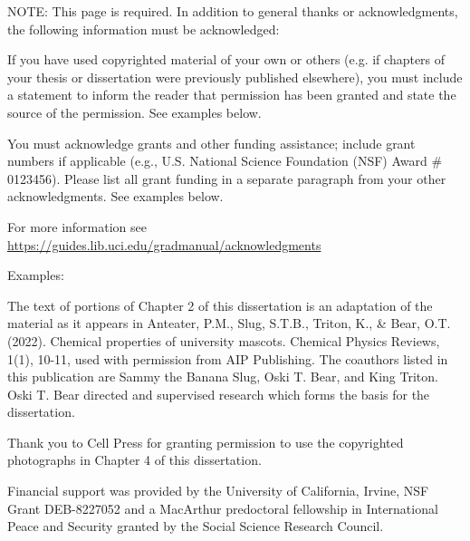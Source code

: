 \acknowledgments
{

NOTE: This page is required. In addition to general thanks or acknowledgments, the following information must be acknowledged:

If you have used copyrighted material of your own or others (e.g. if chapters of your thesis or dissertation were previously published elsewhere), you must include a statement to inform the reader that permission has been granted and state the source of the permission. See examples below.

You must acknowledge grants and other funding assistance; include grant numbers if applicable (e.g., U.S. National Science Foundation (NSF) Award \# 0123456). Please list all grant funding in a separate paragraph from your other acknowledgments. See examples below.

For more information see \url{https://guides.lib.uci.edu/gradmanual/acknowledgments}

Examples:

The text of portions of Chapter 2 of this dissertation is an adaptation of the material as it appears in Anteater, P.M., Slug, S.T.B., Triton, K., \& Bear, O.T. (2022). Chemical properties of university mascots. Chemical Physics Reviews, 1(1), 10-11, used with permission from AIP Publishing. The coauthors listed in this publication are Sammy the Banana Slug, Oski T. Bear, and King Triton. Oski T. Bear directed and supervised research which forms the basis for the dissertation.

Thank you to Cell Press for granting permission to use the copyrighted photographs in Chapter 4 of this dissertation.

Financial support was provided by the University of California, Irvine, NSF Grant DEB-8227052 and a MacArthur predoctoral fellowship in International Peace and Security granted by the Social Science Research Council.
}


\newcommand{\mysoftentry}[3]{
    \textbf{#1} \hfill \url{#2} \\
    {\emph{#3}} \\[-6pt] %
}


%


